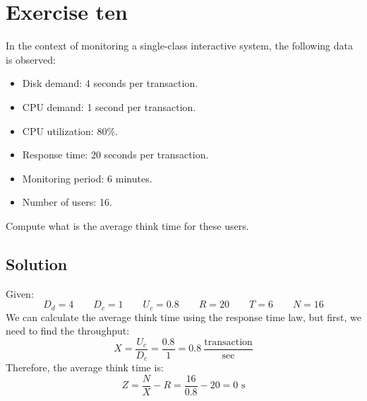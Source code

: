 \section{Exercise ten}

In the context of monitoring a single-class interactive system, the following data is observed:
\begin{itemize}
    \item Disk demand: 4 seconds per transaction.
    \item CPU demand: 1 second per transaction.
    \item CPU utilization: 80\%.
    \item Response time: 20 seconds per transaction.
    \item Monitoring period: 6 minutes.
    \item Number of users: 16.
\end{itemize}
Compute what is the average think time for these users. 

\subsection*{Solution}
Given:
\[D_d=4 \qquad D_c=1 \qquad U_c=0.8 \qquad R=20 \qquad T=6 \qquad N=16\]
We can calculate the average think time using the response time law, but first, we need to find the throughput:
\[X=\dfrac{U_c}{D_c}=\dfrac{0.8}{1}=0.8\:\dfrac{\text{transaction}}{\text{sec}}\]
Therefore, the average think time is:
\[Z=\dfrac{N}{X}-R=\dfrac{16}{0.8}-20=0\text{ s}\]